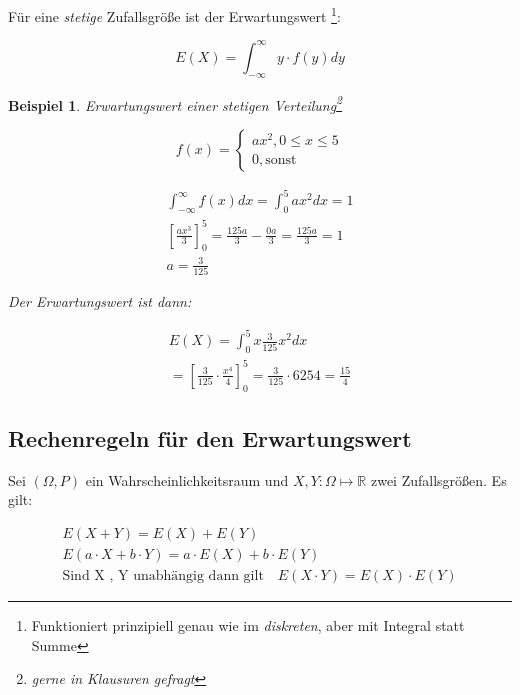 \documentclass{tufte-handout}
\theoremstyle{own}
\newtheorem{example}{Beispiel}[]
\begin{document}
Für eine \textit{stetige} Zufallsgröße ist der Erwartungswert
\footnote{Funktioniert prinzipiell genau wie im \textit{diskreten}, aber mit Integral statt Summe}:

\begin{equation}
E(X) = \int_{-\infty}^{\infty} y \cdot f(y) dy
\end{equation}

\begin{example}\label{bsp:erwartungswertstetig}
Erwartungswert einer stetigen Verteilung\footnote{gerne in Klausuren gefragt}

\begin{equation*}
	f(x) = \begin{cases} 
	ax^2, 0 \leq x \leq 5 \\
	0, \text{sonst}
	\end{cases}
\end{equation*}

\begin{gather*}
\int_{-\infty}^{\infty} f(x)dx = \int_0^5 ax^2 dx = 1 \\
[\frac{a x^3}{3}]_0^5 = \frac{125a}{3} - \frac{0a}{3} =  \frac{125a}{3} = 1 \\
a = \frac{3}{125}
\end{gather*}

Der Erwartungswert ist dann:

\begin{gather*}
E(X) = \int_0^5 x \frac{3}{125} x^2 dx \\
= [\frac{3}{125} \cdot \frac{x^4}{4}]_0^5 = \frac{3}{125} \cdot {625}{4} = \frac{15}{4}
\end{gather*}

\end{example}

\subsection{Rechenregeln für den Erwartungswert}

Sei $(\Omega, P)$ ein Wahrscheinlichkeitsraum und $X,Y : \Omega \mapsto \mathbb{R}$ zwei Zufallsgrößen. Es gilt:

\begin{gather}
E(X + Y) = E(X) + E(Y) \\
E( a \cdot X + b \cdot Y) = a \cdot E(X) + b \cdot E(Y)  \\
\text{Sind X , Y unabhängig dann gilt} \hspace{1em} E (X \cdot Y ) = E ( X )\cdot E ( Y )
\end{gather}
\end{document}
